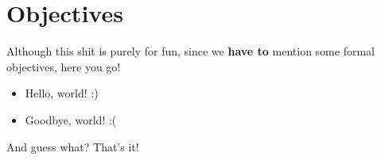 \section{Objectives}

Although this shit is purely for fun, since we \textbf{have to} mention some
formal objectives, here you go!

\begin{itemize}
    \item{} Hello, world! :)
    \item{} Goodbye, world! :(
\end{itemize}

And guess what? That's it!
